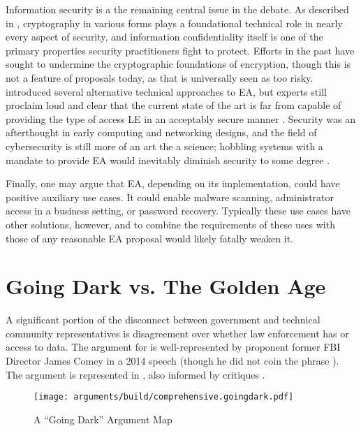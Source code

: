 Information security is a the remaining central issue in the debate. As described in ,
\ac{cryptography} in various forms plays a foundational technical role in nearly every aspect of security, and
information confidentiality itself is one of the primary properties security practitioners fight to protect. Efforts in
the past have sought to undermine the cryptographic foundations of encryption, though this is not a feature of proposals
today, as that is universally seen as too risky.  introduced several alternative technical
approaches to \ac{EA}, but experts still proclaim loud and clear that the current state of the art is far from capable
of providing the type of access \acl{LE} in an acceptably secure manner \cite{abelson_2015} \cite{abelson_risks_1997}.
Security was an afterthought in early computing and networking designs, and the field of cybersecurity is still more of
an art the a science; hobbling systems with a mandate to provide \ac{EA} would inevitably diminish security to some
degree \cite{abelson_2015}.

Finally, one may argue that \ac{EA}, depending on its implementation, could have positive auxiliary use cases. It could
enable malware scanning, administrator access in a business setting, or password recovery. Typically these use cases
have other solutions, however, and to combine the requirements of these uses with those of any reasonable \ac{EA}
proposal would likely fatally weaken it.


\section{Going Dark vs. The Golden Age}

A significant portion of the disconnect between government and technical community representatives is disagreement over
whether law enforcement has  or  access to data. The argument for  is
well-represented by proponent former \ac{FBI} Director James Comey in a 2014 speech \cite{comey_2014} (though he did not
coin the phrase \cite{swire_encryption_2011}). The argument is represented in , also informed
by critiques \cite{rogaway_moral_2015}.

\begin{figure}[h]
  \centering\CaptionFontSize
  \texttt{[image: arguments/build/comprehensive.goingdark.pdf]}
  \caption{A ``Going Dark'' Argument Map}
  \label{fig-arg-going-dark}
\end{figure}

